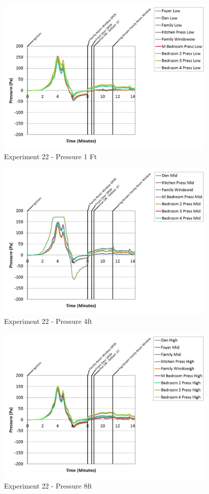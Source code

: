 \documentclass{article}
\begin{document}
\begin{appendices}
	\begin{figure}[h!]
		\centering
		\includegraphics[height=3.05in]{0_Images/Results_Charts/Exp_22_Charts/Pressure1Ft.pdf}
		\caption{Experiment 22 - Pressure 1 Ft}
	\end{figure}
 
	\clearpage

	\begin{figure}[h!]
		\centering
		\includegraphics[height=3.05in]{0_Images/Results_Charts/Exp_22_Charts/Pressure4ft.pdf}
		\caption{Experiment 22 - Pressure 4ft}
	\end{figure}
 

	\begin{figure}[h!]
		\centering
		\includegraphics[height=3.05in]{0_Images/Results_Charts/Exp_22_Charts/Pressure8ft.pdf}
		\caption{Experiment 22 - Pressure 8ft}
	\end{figure}
 

\end{appendices}
\end{document}
